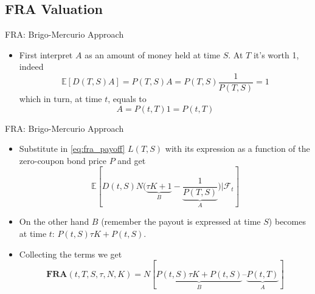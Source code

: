\documentclass{beamer}
\begin{document}
\subsection{FRA Valuation}
\begin{frame}{FRA: Brigo-Mercurio Approach}
	\begin{itemize}
		\item<2-> First interpret $A$ as an amount of money held at time $S$. At $T$ it's worth 1, indeed 
		\begin{equation*}
			\mathbb{E}[D(T,S)A] = P(T,S)A = P(T,S)\frac{1}{P(T,S)}=1
		\end{equation*}
		which in turn, at time $t$, equals to
		\begin{equation*}
			A = P(t,T) 1 = P(t,T)
		\end{equation*}
	\end{itemize}
\end{frame}

\begin{frame}{FRA: Brigo-Mercurio Approach}
	\begin{itemize}
		\item Substitute in \cref{eq:fra_payoff} $L(T,S)$ with its expression as a function of the zero-coupon bond price $P$ and get
		\begin{equation*}
			\mathbb{E}\left[D(t, S) N\bigg(\underbrace{\tau K + 1}_{B} - \underbrace{\frac{1}{P(T, S)}}_{A}\bigg)\bigg| \mathcal{F}_t\right]
		\end{equation*}
		\item<1-> On the other hand $B$ (remember the payout is expressed at time $S$) becomes at time $t$:
		$P(t,S)\tau K + P(t, S)$.
		\item<2-> Collecting the terms we get
		\begin{equation}
			\boxed{\textbf{FRA}(t,T,S,\tau,N,K)=N[\underbrace{P(t,S)\tau K+P(t,S)}_{B}–\underbrace{P(t,T)}_{A}]}
		\end{equation}
	\end{itemize}
	\myendproof
\end{frame}
\end{document}
